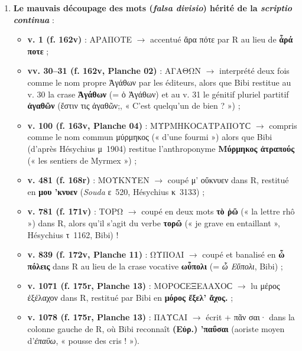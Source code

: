 \documentclass[11pt, a4paper, twoside]{article}
\renewcommand{\_}{\origunderscore\penalty0\relax}
\renewcommand{\texttt}[1]{#1}
\newcommand{\R}{\textbf{R}}
\newcommand{\Bibi}{\textit{Bibi}}
\def\R{R}%
\def\Bibi{Bibi}%
\begin{document}
\begin{enumerate}[leftmargin=1.6em, itemsep=2pt]
  \item \textbf{Le mauvais découpage des mots (\textit{falsa divisio}) hérité de la \textit{scriptio continua}} :
  \begin{itemize}[leftmargin=1.5em, itemsep=2pt]
    \item \textbf{v. 1 (\texttt{f. 162v})} : \texttt{ΑΡΑΠΟΤΕ} $\to$ accentué \texttt{ἄρα πότε} par \R{} au lieu de \textbf{\texttt{ἆρά ποτε}} ;
    \item \textbf{vv. 30–31 (\texttt{f. 162v}, Planche 02)} : \texttt{ΑΓΑΘΩΝ} $\to$ interprété deux fois comme le nom propre \texttt{Ἀγάθων} par les éditeurs, alors que \Bibi{} restitue au v. 30 la crase \textbf{\texttt{Ἁγάθων}} (= ὁ Ἀγάθων) et au v. 31 le génitif pluriel partitif \textbf{\texttt{ἀγαθῶν}} (\texttt{ἔστιν τις ἀγαθῶν;}, « C'est quelqu'un de bien ? ») ;
    \item \textbf{v. 100 (\texttt{f. 163v}, Planche 04)} : \texttt{ΜΥΡΜΗΚΟϹΑΤΡΑΠΟΥϹ} $\to$ compris comme le nom commun \texttt{μύρμηκος} (« d'une fourmi ») alors que \Bibi{} (d'après Hésychius μ~1904) restitue l'anthroponyme \textbf{\texttt{Μύρμηκος ἀτραπούς}} (« les sentiers de Myrmex ») ;
    \item \textbf{v. 481 (\texttt{f. 168r})} : \texttt{ΜΟΥΚΝΥΕΝ} $\to$ coupé \texttt{μ' οὔκνυεν} dans \R{}, restitué en \textbf{\texttt{μου 'κνυεν}} (\textit{Souda} ε~520, Hésychius κ~3133) ;
    \item \textbf{v. 781 (\texttt{f. 171v})} : \texttt{ΤΟΡΩ} $\to$ coupé en deux mots \textbf{\texttt{τὸ ῥῶ}} (« la lettre rhô ») dans \R{}, alors qu'il s'agit du verbe \textbf{\texttt{τορῶ}} (« je grave en entaillant », Hésychius τ~1162, \Bibi{}) !
    \item \textbf{v. 839 (\texttt{f. 172v}, Planche 11)} : \texttt{ΩΥΠΟΛΙ} $\to$ coupé et banalisé en \textbf{\texttt{ὦ πόλεις}} dans \R{} au lieu de la crase vocative \textbf{\texttt{ωὖπολι}} (= \textit{ὦ Εὔπολι}, \Bibi{}) ;
    \item \textbf{v. 1071 (\texttt{f. 175r}, Planche 13)} : \texttt{ΜΟΡΟϹΕΞΕΛΑΧΟϹ} $\to$ lu \texttt{μέρος ἐξέλαχον} dans \R{}, restitué par \Bibi{} en \textbf{\texttt{μόρος ἔξελ' ἄχος.}} ;
    \item \textbf{v. 1078 (\texttt{f. 175r}, Planche 13)} : \texttt{ΠΑΥϹΑΙ} $\to$ écrit \texttt{+ πᾶν σαι·} dans la colonne gauche de \R{}, où \Bibi{} reconnaît \textbf{\texttt{(Εὐρ.) 'παΰσαι}} (aoriste moyen d'\textit{ἐπαΰω}, « pousse des cris ! »).
  \end{itemize}
\end{enumerate}
\end{document}
